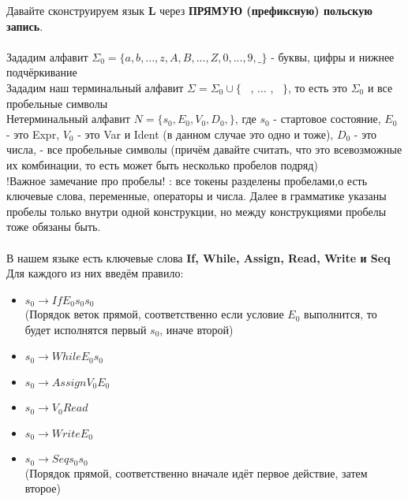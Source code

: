 \documentclass[12pt]{article}
\begin{document}
\pagestyle{fancy}


 Давайте сконструируем язык \textbf{L} через \textbf{ПРЯМУЮ (префиксную) польскую запись}.\\
 \\
 Зададим алфавит $\Sigma_0 = \{a,b,...,z,A,B,...,Z,0,...,9, \_ \}$ - буквы, цифры и нижнее подчёркивание \\
 Зададим наш терминальный алфавит $\Sigma = \Sigma_0 \cup \{$ \ , ... , \ $ \} $, то есть это $\Sigma_0$ и все пробельные символы \\
 Нетерминальный алфавит $N =\{s_0, E_0, V_0, D_0,$\textvisiblespace$  \}$, где $s_0$ - стартовое состояние, $E_0$ - это Expr, $V_0$ - это Var и Ident (в данном случае это одно и тоже), $D_0$ - это числа, \textvisiblespace - все пробельные символы (причём давайте считать, что это всевозможные их комбинации, то есть может быть несколько пробелов подряд) \\
 !Важное замечание про пробелы! : все токены разделены пробелами,о есть ключевые слова, переменные, операторы и числа. Далее в грамматике указаны пробелы только внутри одной конструкции, но между конструкциями пробелы тоже обязаны быть. \\ 
 \\
 В нашем языке есть ключевые слова \textbf{If, While, Assign, Read, Write и Seq} \\
 Для каждого из них введём правило: \\ 
 \begin{itemize}
 	\item $s_0 \to If $\textvisiblespace$ E_0 $\textvisiblespace$ s_0 $\textvisiblespace$ s_0$ \\
 	(Порядок веток прямой, соответственно если условие $E_0$ выполнится, то будет исполнятся первый $s_0$, иначе второй) 
 	\item $s_0 \to While $\textvisiblespace$ E_0 $\textvisiblespace$ s_0 $
 	\item $s_0 \to Assign $\textvisiblespace$V_0 $\textvisiblespace$ E_0 $
 	\item $s_0 \to V_0 $\textvisiblespace$ Read$ 
 	\item $s_0 \to Write $\textvisiblespace$  E_0 $
 	\item $s_0 \to Seq $\textvisiblespace$  s_0 $\textvisiblespace$ s_0 $ \\
 	(Порядок прямой, соответственно вначале идёт первое действие, затем второе) 
 \end{itemize}

		
\vspace{\baselineskip}
 
\end{document}
